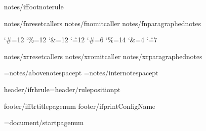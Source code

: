 
{notes/iffootnoterule}\def\footnoterule{{}} 

{notes/fnresetcallers}
{notes/fnomitcaller}
{notes/fnparagraphednotes}

\catcode`\#=12 \catcode`\%=12 \catcode`\&=12 \catcode`\^=12
\catcode`\#=6 \catcode`\%=14 \catcode`\&=4 \catcode`\^=7
%

{notes/xrresetcallers}
{notes/xromitcaller}
{notes/xrparagraphednotes}

\AboveNoteSpace={notes/abovenotespace}pt
\InterNoteSpace={notes/internotespace}pt

\def\HeaderPosition{{{header/headerposition}}}
\def\FooterPosition{{{header/footerposition}}}
{header/ifrhrule}\RHruleposition={header/ruleposition}pt
\def\RangeSeparator{{\kern.1em\char"2013\kern.1em}} %
\def\ChapterVerseSeparator{{\kern.02em{header/chvseparator}\kern.02em}} %

\def\RHoddleft{{{header/oddleft}}}
\def\RHoddcenter{{{header/oddcenter}}}
\def\RHoddright{{{header/oddright}}}

\def\RHevenleft{{{header/evenleft}}}
\def\RHevencenter{{{header/evencenter}}}
\def\RHevenright{{{header/evenright}}}


\def\RFoddcenter{{{footer/oddcenter}}}
\def\RFevencenter{{{footer/oddcenter}}}
\def\RFtitlecenter{{{footer/oddcenter}}}

{footer/ifftrtitlepagenum}\def\RFtitlecenter{{\pagenumber}}
{footer/ifprintConfigName}\def\RFtitlecenter{{{config/name}}}

\pageno={document/startpagenum}

